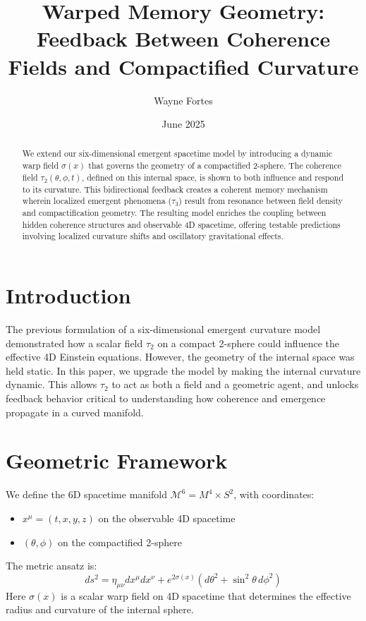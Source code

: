 \documentclass[12pt]{article}
\title{\textbf{Warped Memory Geometry: Feedback Between Coherence Fields and Compactified Curvature}}
\author{Wayne Fortes}
\date{June 2025}
\begin{document}
\maketitle

\begin{abstract}
We extend our six-dimensional emergent spacetime model by introducing a dynamic warp field \( \sigma(x) \) that governs the geometry of a compactified 2-sphere. The coherence field \( \tau_2(\theta, \phi, t) \), defined on this internal space, is shown to both influence and respond to its curvature. This bidirectional feedback creates a coherent memory mechanism wherein localized emergent phenomena (\( \tau_3 \)) result from resonance between field density and compactification geometry. The resulting model enriches the coupling between hidden coherence structures and observable 4D spacetime, offering testable predictions involving localized curvature shifts and oscillatory gravitational effects.
\end{abstract}

\section{Introduction}
The previous formulation of a six-dimensional emergent curvature model demonstrated how a scalar field \( \tau_2 \) on a compact 2-sphere could influence the effective 4D Einstein equations. However, the geometry of the internal space was held static. In this paper, we upgrade the model by making the internal curvature dynamic. This allows \( \tau_2 \) to act as both a field and a geometric agent, and unlocks feedback behavior critical to understanding how coherence and emergence propagate in a curved manifold.

\section{Geometric Framework}
We define the 6D spacetime manifold \( \mathcal{M}^6 = M^4 \times S^2 \), with coordinates:
\begin{itemize}
    \item \( x^\mu = (t, x, y, z) \) on the observable 4D spacetime
    \item \( (\theta, \phi) \) on the compactified 2-sphere
\end{itemize}

The metric ansatz is:
\[
ds^2 = \eta_{\mu\nu} dx^\mu dx^\nu + e^{2\sigma(x)} (d\theta^2 + \sin^2\theta \, d\phi^2)
\]
Here \( \sigma(x) \) is a scalar warp field on 4D spacetime that determines the effective radius and curvature of the internal sphere.
\end{document}
